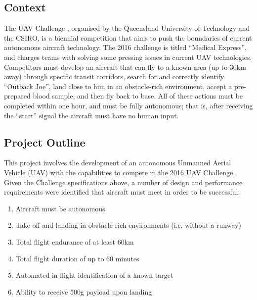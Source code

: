 \subsection{Context}
The UAV Challenge \cite{ref:challenge}, organised by the Queensland University of Technology and the CSIRO, is a biennial competition that aims to push the boundaries of current autonomous aircraft technology. The 2016 challenge is titled ``Medical Express'', and charges teams with solving some pressing issues in current UAV technologies.\\

Competitors must develop an aircraft that can fly to a known area (up to 30km away) through specific transit corridors, search for and correctly identify ``Outback Joe'', land close to him in an obstacle-rich environment, accept a pre-prepared blood sample, and then fly back to base. All of these actions must be completed within one hour, and must be fully autonomous; that is, after receiving the ``start'' signal the aircraft must have no human input.

\subsection{Project Outline}
This project involves the development of an autonomous Unmanned Aerial Vehicle (UAV) with the capabilities to compete in the 2016 UAV Challenge. Given the Challenge specifications above, a number of design and performance requirements were identified that aircraft must meet in order to be successful:
\begin{enumerate}[label=\bfseries R\arabic*:] \itemsep-2pt
	\item Aircraft must be autonomous
	\item Take-off and landing in obstacle-rich environments (i.e. without a runway)
	\item Total flight endurance of at least 60km
	\item Total flight duration of up to 60 minutes
	\item Automated in-flight identification of a known target
	\item Ability to receive 500g payload upon landing
\end{enumerate}

